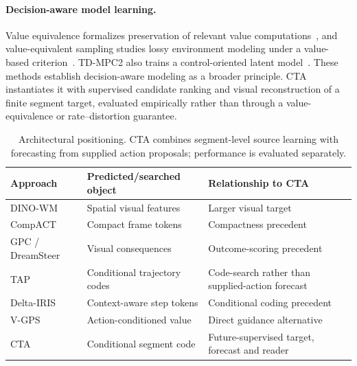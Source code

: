 \paragraph{Decision-aware model learning.}
Value equivalence formalizes preservation of relevant value computations~\cite{grimm2020value}, and value-equivalent sampling studies lossy environment modeling under a value-based criterion~\cite{arumugam2022deciding}. TD-MPC2 also trains a control-oriented latent model~\cite{hansen2024tdmpc2}. These methods establish decision-aware modeling as a broader principle. CTA instantiates it with supervised candidate ranking and visual reconstruction of a finite segment target, evaluated empirically rather than through a value-equivalence or rate--distortion guarantee.

\begin{table}[t]
\centering\small
\setlength{\tabcolsep}{3pt}
\begin{tabular}{p{.20\linewidth}p{.33\linewidth}p{.38\linewidth}}
\toprule
Approach & Predicted/searched object & Relationship to CTA \\
\midrule
DINO-WM & Spatial visual features & Larger visual target \\
CompACT & Compact frame tokens & Compactness precedent \\
GPC / DreamSteer & Visual consequences & Outcome-scoring precedent \\
TAP & Conditional trajectory codes & Code-search rather than supplied-action forecast \\
Delta-IRIS & Context-aware step tokens & Conditional coding precedent \\
V-GPS & Action-conditioned value & Direct guidance alternative \\
CTA & Conditional segment code & Future-supervised target, forecast and reader \\
\bottomrule
\end{tabular}
\caption{Architectural positioning. CTA combines segment-level source learning with forecasting from supplied action proposals; performance is evaluated separately.}
\label{tab:position}
\end{table}
